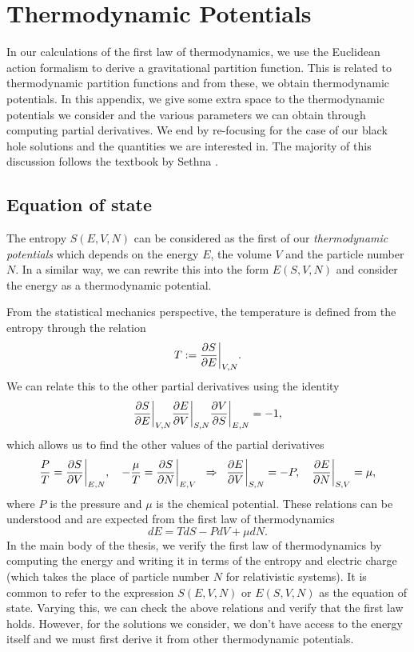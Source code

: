 \chapter{Thermodynamic Potentials}
\label{app:thermo}

In our calculations of the first law of thermodynamics, we use the Euclidean action formalism to derive a gravitational partition function. This is related to thermodynamic partition functions and from these, we obtain thermodynamic potentials. In this appendix, we give some extra space to the thermodynamic potentials we consider and the various parameters we can obtain through computing partial derivatives. We end by re-focusing for the case of our black hole solutions and the quantities we are interested in. The majority of this discussion follows the textbook by Sethna \cite{Sethna:2006}.

\section{Equation of state}

The entropy $S(E,V,N)$ can be considered as the first of our \emph{thermodynamic potentials} which depends on the energy $E$, the volume $V$ and the particle number $N$. In a similar way, we can rewrite this into the form $E(S,V,N)$ and consider the energy as a thermodynamic potential.

From the statistical mechanics perspective, the temperature is defined from the entropy through the relation
\begin{equation*}
	T := \frac{\partial S}{\partial E} \bigg|_{V,N}.
\end{equation*}
We can relate this to the other partial derivatives using the identity
\begin{equation*}
	\frac{\partial S}{\partial E} \bigg|_{V,N} \frac{\partial E}{\partial V} \bigg|_{S,N} \frac{\partial V}{\partial S} \bigg|_{E,N} = -1,
\end{equation*}
which allows us to find the other values of the partial derivatives
\begin{equation*}
	\frac{P}{T} = \frac{\partial S}{\partial V} \bigg|_{E,N}, \quad -\frac{\mu}{T} = \frac{\partial S}{\partial N} \bigg|_{E,V} \;\; \Rightarrow \;\;  \frac{\partial E}{\partial V} \bigg|_{S,N} = -P, \quad \frac{\partial E}{\partial N} \bigg|_{S,V} = \mu,
\end{equation*}
where $P$ is the pressure and $\mu$ is the chemical potential. These relations can be understood and are expected from the first law of thermodynamics
\begin{equation*}
	dE = TdS - PdV + \mu dN.
\end{equation*}
In the main body of the thesis, we verify the first law of thermodynamics by computing the energy and writing it in terms of the entropy and electric charge (which takes the place of particle number $N$ for relativistic systems). It is common to refer to the expression $S(E,V,N)$ or $E(S,V,N)$ as the equation of state. Varying this, we can check the above relations and verify that the first law holds. However, for the solutions we consider, we don't have access to the energy itself and we must first derive it from other thermodynamic potentials.

